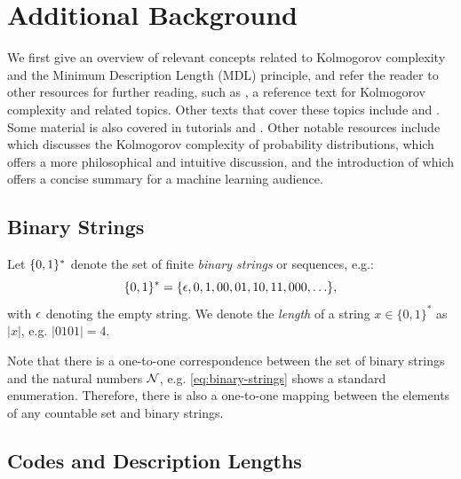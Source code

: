 
\section{Additional Background}
\label{sec:app-background}

We first give an overview of relevant concepts related to Kolmogorov complexity and the Minimum Description Length (MDL) principle, and refer the reader to other resources for further reading, such as \citet{li2008introduction}, a reference text for Kolmogorov complexity and related topics. Other texts that cover these topics include \citet{cover2006elements} and \citet{hutter2005universal}. Some material is also covered in tutorials \citet{grunwald2008algorithmic} and \citet{grunwald2004tutorial}. Other notable resources include \citet{barron1985logically} which discusses the Kolmogorov complexity of probability distributions, \citet{rathmanner2011philosophical} which offers a more philosophical and intuitive discussion, and the introduction of \citet{schmidhuber1997discovering} which offers a concise summary for a machine learning audience. 

\subsection{Binary Strings}
\label{sec:binary-strings}

 Let $\{0,1\}^*$ denote the set of finite \emph{binary strings} or sequences, e.g.:
\begin{equation}
\{0,1\}^* = \{{\epsilon}, 0, 1, 00, 01, 10, 11, 000, \ldots \},
\label{eq:binary-strings}
\end{equation}
with ${\epsilon}$ denoting the empty string. We denote the \emph{length} of a string $x \in \{0,1\}^*$ as $|x|$, e.g. $|0101| = 4$.

Note that there is a one-to-one correspondence between the set of binary strings and the natural numbers ${\mathcal{N}}$, e.g. \eqref{eq:binary-strings} shows a standard enumeration. Therefore, there is also a one-to-one mapping between the elements of any countable set and binary strings. 

\subsection{Codes and Description Lengths}
\label{sec:codes-and-description-lengths}

